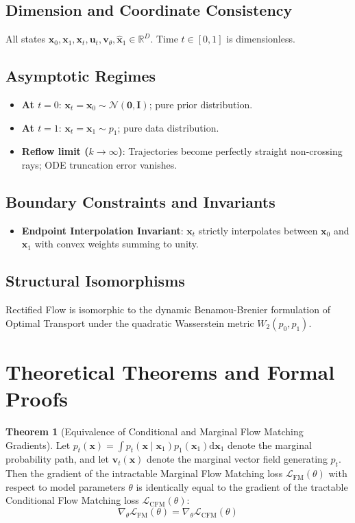 \documentclass[11pt,a4paper]{article}
\theoremstyle{definition}
\newtheorem{theorem}{\textbf{Theorem}}[section]
\begin{document}
\subsection{Dimension and Coordinate Consistency}
All states $\mathbf{x}_0, \mathbf{x}_1, \mathbf{x}_t, \mathbf{u}_t, \mathbf{v}_\theta, \hat{\mathbf{x}}_1 \in \mathbb{R}^D$. Time $t \in [0, 1]$ is dimensionless.

\subsection{Asymptotic Regimes}
\begin{itemize}
    \item \textbf{At $t = 0$}: $\mathbf{x}_t = \mathbf{x}_0 \sim \mathcal{N}(\mathbf{0}, \mathbf{I})$; pure prior distribution.
    \item \textbf{At $t = 1$}: $\mathbf{x}_t = \mathbf{x}_1 \sim p_1$; pure data distribution.
    \item \textbf{Reflow limit ($k \to \infty$)}: Trajectories become perfectly straight non-crossing rays; ODE truncation error vanishes.
\end{itemize}

\subsection{Boundary Constraints and Invariants}
\begin{itemize}
    \item \textbf{Endpoint Interpolation Invariant}: $\mathbf{x}_t$ strictly interpolates between $\mathbf{x}_0$ and $\mathbf{x}_1$ with convex weights summing to unity.
\end{itemize}

\subsection{Structural Isomorphisms}
Rectified Flow is isomorphic to the dynamic Benamou-Brenier formulation of Optimal Transport under the quadratic Wasserstein metric $W_2(p_0, p_1)$.

\section{Theoretical Theorems and Formal Proofs}

\begin{theorem}[Equivalence of Conditional and Marginal Flow Matching Gradients]
Let $p_t(\mathbf{x}) = \int p_t(\mathbf{x} \mid \mathbf{x}_1) p_1(\mathbf{x}_1) \mathrm{d}\mathbf{x}_1$ denote the marginal probability path, and let $\mathbf{v}_t(\mathbf{x})$ denote the marginal vector field generating $p_t$. Then the gradient of the intractable Marginal Flow Matching loss $\mathcal{L}_{\text{FM}}(\theta)$ with respect to model parameters $\theta$ is identically equal to the gradient of the tractable Conditional Flow Matching loss $\mathcal{L}_{\text{CFM}}(\theta)$:
{\boldmath
\begin{equation}
\nabla_\theta \mathcal{L}_{\text{FM}}(\theta) = \nabla_\theta \mathcal{L}_{\text{CFM}}(\theta)
\end{equation}
}
\end{theorem}
\end{document}
